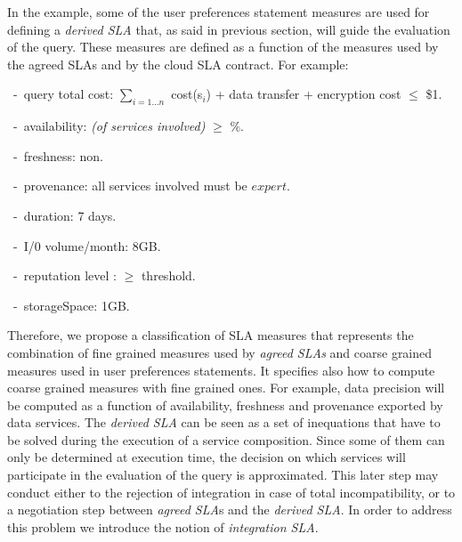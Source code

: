 In the example, some of the user preferences statement measures are used for defining a {\em derived SLA} that, as said in previous section, will guide the evaluation of the query. 
These measures are defined as a function of the measures used by the agreed SLAs and by the cloud SLA contract. For example: 
\begin{trivlist}\sf\footnotesize
 \item[~-~query total cost:] $\sum_{i = 1\dots n}$ cost(s$_i$) + data transfer + encryption cost $\leq$ \$1.
 \item[~-~availability:] {\em (of services involved)} $\geq$ {$\%$}.
 \item[~-~freshness:] non.
 \item[~-~provenance:] all services involved must be $expert$.
 \item[~-~duration:] 7 days.
 \item[~-~I/0 volume/month:] 8GB.
 \item[~-~reputation level :] $\geq$ threshold.
 \item[~-~storageSpace:] 1GB.
 \end{trivlist} 
 
Therefore, we propose a classification of SLA measures that represents the combination of fine grained measures used by {\em agreed SLAs} and coarse grained measures used in user preferences statements. 
It specifies also how to compute coarse grained measures with fine grained ones. 
For example, data precision will be computed as a function of availability, freshness and provenance exported by data services. The {\em derived SLA} can be seen as a set of inequations that have to be solved during the execution of a service composition. Since some of them can only be determined at execution time, the decision on which services will participate in the evaluation of the query is approximated.  
This later step may conduct either to the rejection of integration in case of total incompatibility, or to a negotiation step between {\em agreed SLA}s and the {\em derived SLA}. In order to address this problem we introduce the notion of  {\em integration SLA}. 
 

